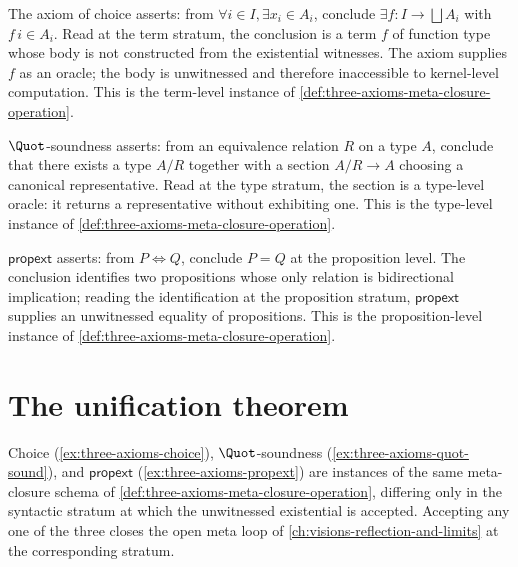 \begin{example}
\label{ex:three-axioms-choice}
The axiom of choice asserts: from $\forall i \in I, \exists x_i \in A_i$, conclude $\exists f \colon I \to \bigsqcup A_i$ with $f\,i \in A_i$. Read at the term stratum, the conclusion is a term $f$ of function type whose body is not constructed from the existential witnesses. The axiom supplies $f$ as an oracle; the body is unwitnessed and therefore inaccessible to kernel-level computation. This is the term-level instance of \autoref{def:three-axioms-meta-closure-operation}.
\end{example}

\begin{example}
\label{ex:three-axioms-quot-sound}
$\Quot$-soundness asserts: from an equivalence relation $R$ on a type $A$, conclude that there exists a type $A / R$ together with a section $A / R \to A$ choosing a canonical representative. Read at the type stratum, the section is a type-level oracle: it returns a representative without exhibiting one. This is the type-level instance of \autoref{def:three-axioms-meta-closure-operation}.
\end{example}

\begin{example}
\label{ex:three-axioms-propext}
$\mathsf{propext}$ asserts: from $P \Leftrightarrow Q$, conclude $P = Q$ at the proposition level. The conclusion identifies two propositions whose only relation is bidirectional implication; reading the identification at the proposition stratum, $\mathsf{propext}$ supplies an unwitnessed equality of propositions. This is the proposition-level instance of \autoref{def:three-axioms-meta-closure-operation}.
\end{example}

\section{The unification theorem}
\label{sec:three-axioms-unification}

\begin{theorem}
\label{thm:three-axioms-unification}
Choice (\autoref{ex:three-axioms-choice}), $\Quot$-soundness (\autoref{ex:three-axioms-quot-sound}), and $\mathsf{propext}$ (\autoref{ex:three-axioms-propext}) are instances of the same meta-closure schema of \autoref{def:three-axioms-meta-closure-operation}, differing only in the syntactic stratum at which the unwitnessed existential is accepted. Accepting any one of the three closes the open meta loop of \autoref{ch:visions-reflection-and-limits} at the corresponding stratum.
\end{theorem}

